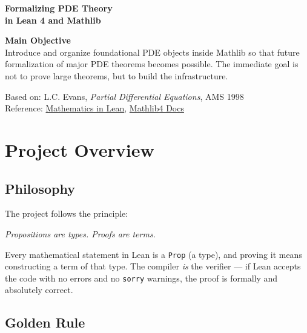 ﻿\documentclass[12pt, a4paper]{article}
\renewcommand{\_}{\origunderscore\allowbreak}
\theoremstyle{definition}
\theoremstyle{plain}
\begin{document}
\begin{titlepage}
  \centering
  \vspace*{2cm}
  {\Huge\bfseries\color{titlegray} Formalizing PDE Theory\\[0.4em]
   \large in Lean 4 and Mathlib}\\[3cm]
  \begin{tcolorbox}[colback=leanblue!5, colframe=leanblue!40, width=0.85\textwidth]
    \centering
    \textbf{Main Objective}\\[0.5em]
    Introduce and organize foundational PDE objects inside Mathlib
    so that future formalization of major PDE theorems becomes possible.
    The immediate goal is not to prove large theorems, but to build
    the infrastructure.
  \end{tcolorbox}
  \vfill
  {\small Based on: L.C. Evans, \textit{Partial Differential Equations}, AMS 1998}\\
  {\small Reference: \href{https://leanprover-community.github.io/mathematics_in_lean/}
    {Mathematics in Lean}, \href{https://leanprover-community.github.io/mathlib4_docs/}{Mathlib4 Docs}}
\end{titlepage}

\tableofcontents
\newpage

\section{Project Overview}

\subsection{Philosophy}

The project follows the principle:
\begin{center}
  \textit{Propositions are types. Proofs are terms.}
\end{center}
Every mathematical statement in Lean is a \texttt{Prop} (a type), and proving it
means constructing a term of that type. The compiler \emph{is} the verifier ---
if Lean accepts the code with no errors and no \texttt{sorry} warnings, the proof
is formally and absolutely correct.

\subsection{Golden Rule}
\end{document}

